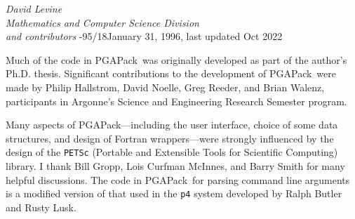 \documentclass{report}
\newcommand{\pga}{PGAPack}
\begin{document}
{\em David Levine\\[.1in]
Mathematics and Computer Science Division\\[.1in]
and contributors
}{-95/18}{January 31, 1996, last updated Oct 2022}



\date{\today}

\newpage


Much of the code in \pga\ was originally developed as part of the author's
Ph.D. thesis.  Significant contributions to the development of
\pga\ were made by Philip Hallstrom, David Noelle, Greg Reeder, and Brian
Walenz, participants in Argonne's Science and Engineering Research Semester
program.

Many aspects of \pga---including the user interface, choice of some data
structures, and design of Fortran wrappers---were strongly influenced by the
design of the {\tt PETSc} (Portable and Extensible Tools for Scientific
Computing) library.
I thank Bill Gropp, Lois Curfman McInnes, and Barry Smith
for many helpful discussions.  The code in \pga\ for parsing command line
arguments is a modified version of that used in the {\tt p4} system
developed by Ralph Butler and  Rusty Lusk.

\newpage
\end{document}

